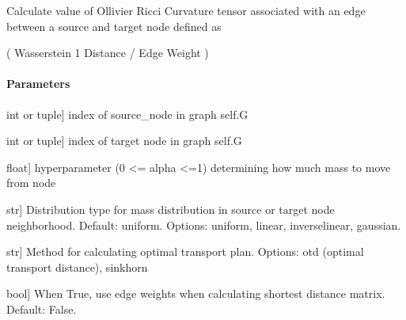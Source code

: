 \documentclass[letterpaper,10pt,english]{sphinxmanual}
\begin{document}
\begin{fulllineitems}
\begin{fulllineitems}
\label{\detokenize{graph_ricci_curvature:graph_ricci_curvature.ollivier_ricci_curvature.OllivierRicciCurvature.calculate_edge_curvature}}
\pysigstartsignatures
{}
\pysigstopsignatures
\sphinxAtStartPar
Calculate value of Ollivier Ricci Curvature tensor associated with an edge
between a source and target node defined as

 \sphinxhyphen{} ( Wasserstein 1 Distance / Edge Weight )


\paragraph{Parameters}
\label{\detokenize{graph_ricci_curvature:id4}}\begin{description}
\sphinxlineitem{source\_node}{[}int or tuple{]}
\sphinxAtStartPar
index of source\_node in graph self.G

\sphinxlineitem{target\_node}{[}int or tuple{]}
\sphinxAtStartPar
index of target node in graph self.G

\sphinxlineitem{alpha}{[}float{]}
\sphinxAtStartPar
hyperparameter (0 \textless{}= alpha \textless{}=1) determining how much mass to move
from node

\sphinxlineitem{dist\_type}{[}str{]}
\sphinxAtStartPar
Distribution type for mass distribution in source or target node neighborhood. Default: uniform. Options: uniform, linear, inverse\sphinxhyphen{}linear, gaussian.

\sphinxlineitem{method}{[}str{]}
\sphinxAtStartPar
Method for calculating optimal transport plan. Options: otd (optimal transport distance), sinkhorn

\sphinxlineitem{weight\_path\_matrix}{[}bool{]}
\sphinxAtStartPar
When True, use edge weights when calculating shortest distance matrix. Default: False.


\end{description}
\end{fulllineitems}
\end{fulllineitems}
\end{document}
